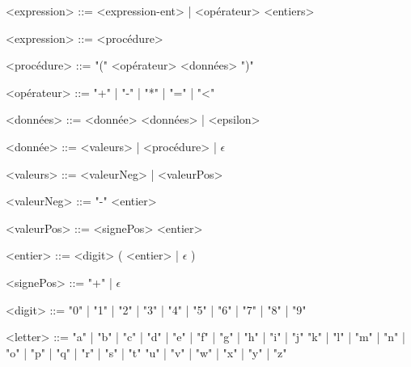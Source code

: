 
	\begin{grammarC}{<expression> ::= <expression-ent> | <opérateur> <entiers>}
		
		<expression> ::= <procédure>
		
		<procédure> ::= "(" <opérateur> <données> ")"
				
		<opérateur> ::= "+" | "-" | "*" | "=" | "<" 
		
		<données> ::= <donnée> <données> | <epsilon>
		
		<donnée> ::= <valeurs> | <procédure> | $\epsilon$
		
		<valeurs> ::= <valeurNeg> | <valeurPos>
		
		<valeurNeg> ::= "-" <entier>
		
		<valeurPos> ::= <signePos> <entier>
		
 		<entier> ::= <digit> ( <entier> | $\epsilon$ )

		<signePos> ::= "+" | $\epsilon$ 
		
		<digit> ::= "0" | "1" | "2" | "3" | "4" | "5" | "6" | "7" | "8" | "9"
		
		<letter> ::= "a" | "b" | "c" | "d" | "e" | "f" | "g" | "h" | "i" | "j"
			    \alt "k" | "l" | "m" | "n" | "o" | "p" | "q" | "r" | "s" | "t"
				\alt "u" | "v" | "w" | "x" | "y" | "z"
		
		
	\end{grammarC}

